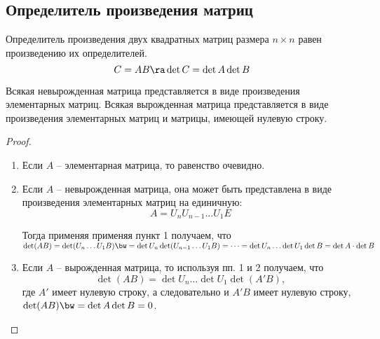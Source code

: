 \subsection{Определитель произведения матриц}
\label{matrixdet:mul}

\begin{theorem}
	Определитель произведения двух квадратных матриц размера $n\times n$
	равен произведению их определителей.
	$$C=AB \ra \det C = \det A \det B$$
\end{theorem}

\begin{lemma}
  Всякая невырожденная матрица представляется в виде произведения элементарных матриц. Всякая вырожденная матрица представляется в виде произведения элементарных матриц и матрицы, имеющей нулевую строку.
\end{lemma}

\begin{proof}
\begin{enumerate}
  \item Если $A$ -- элементарная матрица, то равенство очевидно.

  \item Если $A$ -- невырожденная матрица, она может быть представлена в виде произведения элементарных матриц на единичную:
  $$A=U_nU_{n-1}\dots U_1E$$

  Тогда применяя применяя пункт 1 получаем, что $\det(AB)=\det(U_n\dots U_1B)\bw=\det U_n\det(U_{n-1}\dots U_1B)=\dots =\det U_n \dots\det U_1 \det B=\det A\cdot\det B$

  \item Если $A$ -- вырожденная матрица, то используя пп. 1 и 2 получаем, что
  $$\det(AB)=\det U_n \dots\det U_1 \det(A'B),$$ где $A'$ имеет нулевую строку, а следовательно и $A'B$ имеет нулевую строку, $\det(AB)\bw=\det A\det B=0$.
\end{enumerate}
\end{proof}






